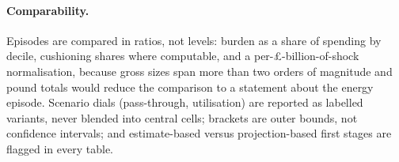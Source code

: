 \paragraph{Comparability.} Episodes are compared in ratios, not
levels: burden as a share of spending by decile, cushioning shares
where computable, and a per-\pounds-billion-of-shock normalisation,
because gross sizes span more than two orders of magnitude and pound
totals would reduce the comparison to a statement about the energy
episode. Scenario dials (pass-through, utilisation) are reported as
labelled variants, never blended into central cells; brackets are outer
bounds, not confidence intervals; and estimate-based versus
projection-based first stages are flagged in every table.

